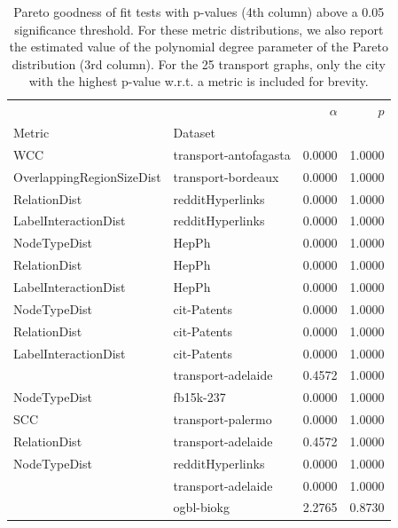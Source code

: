 \begin{table}[H]
    \centering
\caption[Pareto goodness of fit tests with p-values above a 0.05 significance threshold.]{Pareto goodness of fit tests with p-values (4th column) above a 0.05 significance threshold. For these metric distributions, we also report the estimated value of the polynomial degree parameter of the Pareto distribution (3rd column). For the 25 transport graphs, only the city with the highest p-value w.r.t. a metric is included for brevity.}
\label{tab:pareto}
\begin{adjustbox}{width=0.5\columnwidth}
\begin{tabular}{llrr}
\toprule
             &                   &  $\alpha$ &  $p$ \\
Metric & Dataset &              &               \\
\midrule
WCC & transport-antofagasta &       0.0000 &        1.0000 \\
OverlappingRegionSizeDist & transport-bordeaux &       0.0000 &        1.0000 \\
RelationDist & redditHyperlinks &       0.0000 &        1.0000 \\
LabelInteractionDist & redditHyperlinks &       0.0000 &        1.0000 \\
NodeTypeDist & HepPh &       0.0000 &        1.0000 \\
RelationDist & HepPh &       0.0000 &        1.0000 \\
LabelInteractionDist & HepPh &       0.0000 &        1.0000 \\
NodeTypeDist & cit-Patents &       0.0000 &        1.0000 \\
RelationDist & cit-Patents &       0.0000 &        1.0000 \\
LabelInteractionDist & cit-Patents &       0.0000 &        1.0000 \\
             & transport-adelaide &       0.4572 &        1.0000 \\
NodeTypeDist & fb15k-237 &       0.0000 &        1.0000 \\
SCC & transport-palermo &       0.0000 &        1.0000 \\
RelationDist & transport-adelaide &       0.4572 &        1.0000 \\
NodeTypeDist & redditHyperlinks &       0.0000 &        1.0000 \\
             & transport-adelaide &       0.0000 &        1.0000 \\
             & ogbl-biokg &       2.2765 &        0.8730 \\

\end{tabular}
\end{adjustbox}
\end{table}

